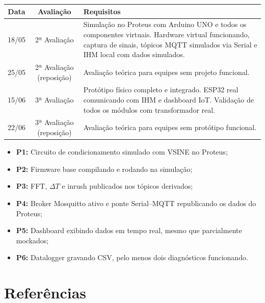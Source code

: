 \documentclass[12pt, a4paper]{article}
\begin{document}
\begin{center}
\renewcommand{\arraystretch}{1.4}
\begin{tabular}{ccp{7cm}}
\toprule
\textbf{Data} & \textbf{Avaliação} & \textbf{Requisitos} \\
\midrule
18/05 & 2ª Avaliação &
    Simulação no Proteus com Arduino UNO e todos os componentes virtuais. Hardware virtual funcionando, captura de sinais, tópicos MQTT simulados via Serial e IHM local com dados simulados. \\
\midrule
25/05 & 2ª Avaliação (reposição) &
    Avaliação teórica para equipes sem projeto funcional. \\
\midrule
15/06 & 3ª Avaliação &
    Protótipo físico completo e integrado. ESP32 real comunicando com IHM e dashboard IoT. Validação de todos os módulos com transformador real. \\
\midrule
22/06 & 3ª Avaliação (reposição) &
    Avaliação teórica para equipes sem protótipo funcional. \\
\bottomrule
\end{tabular}
\end{center}

\begin{tcolorbox}[caixaAviso, title={Prioridades para 18/05}]
\begin{itemize}[leftmargin=1cm, itemsep=2pt]
    \item \textbf{P1:} Circuito de condicionamento simulado com VSINE no Proteus;
    \item \textbf{P2:} Firmware base compilando e rodando na simulação;
    \item \textbf{P3:} FFT, $\Delta T$ e inrush publicados nos tópicos derivados;
    \item \textbf{P4:} Broker Mosquitto ativo e ponte Serial--MQTT republicando os dados do Proteus;
    \item \textbf{P5:} Dashboard exibindo dados em tempo real, mesmo que parcialmente mockados;
    \item \textbf{P6:} Datalogger gravando CSV, pelo menos dois diagnósticos funcionando.
\end{itemize}
\end{tcolorbox}

\section*{Referências}
\end{document}
